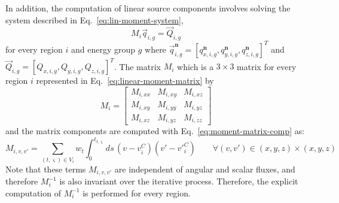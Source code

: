 In addition, the computation of linear source components involves solving the system described in Eq.~\ref{eq:lin-moment-system},
\begin{equation*}
M_i \vec{q}_{i,g} = \vec{Q}_{i,g}
\end{equation*}
for every region $i$ and energy group $g$ where $\vec{q}_{i,g}^{\mathbf{n}} = \left[q_{x,i,g}^{\mathbf{n}}, q_{y,i,g}^{\mathbf{n}}, q_{z,i,g}^{\mathbf{n}} \right]^T$ and $\vec{Q}_{i,g} = \left[Q_{x,i,g}, Q_{y,i,g}, Q_{z,i,g}\right]^T$. The matrix $M_i$ which is a $3 \times 3$ matrix for every region $i$ represented in Eq.~\ref{eq:linear-moment-matrix} by
\begin{equation*}
M_i = 
\begin{bmatrix}
M_{i,xx} & M_{i,xy}  & M_{i,xz} \\
M_{i,xy} & M_{i,yy}  & M_{i,yz} \\
M_{i,xz} & M_{i,yz}  & M_{i,zz}
\end{bmatrix}
\end{equation*}
and the matrix components are computed with Eq.~\ref{eq:moment-matrix-comp} as:
\begin{equation*}
M_{i,v,v'} = \sum_{(t,\varsigma) \in V_i} w_t  \int_{0}^{\ell_{t,\varsigma}} ds \, \left(v - v^C_i\right) \left( v' - {v'}^C_i \right) \qquad \forall (v,v') \in (x,y,z) \times (x,y,z)
\end{equation*}
Note that these terms $M_{i,v,v'}$ are independent of angular and scalar fluxes, and therefore $M_i^{-1}$ is also invariant over the iterative process. Therefore, the explicit computation of $M_i^{-1}$ is performed for every region.

